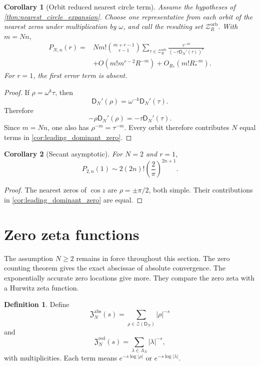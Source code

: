 \documentclass[11pt,letterpaper]{article}
\newtheorem{corollary}[corollary]{Corollary}
\theoremstyle{definition}
\newtheorem{definition}[definition]{Definition}
\theoremstyle{remark}
\newcommand{\Zcal}{\mathcal Z}
\newcommand{\Dfun}{\mathsf D}
\begin{document}
\begin{corollary}[Orbit reduced nearest circle term]\label{cor:orbit_reduced_asymptotic}
Assume the hypotheses of \cref{thm:nearest_circle_expansion}.  Choose one representative from each orbit of the nearest zeros under multiplication by $\omega$, and call the resulting set $\Zcal_R^{\mathrm{orb}}$.  With $m=Nn$,
\[
\begin{aligned}
P_{N,n}(r)
={}&N m!\binom{m+r-1}{r-1}
\sum_{\tau\in\Zcal_R^{\mathrm{orb}}}
\frac{\tau^{-m}}{(-\tau\Dfun_N'(\tau))^r}
\\
&+O\left(m!m^{r-2}R^{-m}\right)
+O_{R_*}\left(m!R_*^{-m}\right).
\end{aligned}
\]
For $r=1$, the first error term is absent.
\end{corollary}

\begin{proof}
If $\rho=\omega^k\tau$, then
\[
\Dfun_N'(\rho)=\omega^{-k}\Dfun_N'(\tau).
\]
Therefore
\[
-\rho\Dfun_N'(\rho)
=-\tau\Dfun_N'(\tau).
\]
Since $m=Nn$, one also has $\rho^{-m}=\tau^{-m}$.  Every orbit therefore contributes $N$ equal terms in \cref{cor:leading_dominant_zero}.
\end{proof}

\begin{corollary}[Secant asymptotic]\label{cor:secant_asymptotic}
For $N=2$ and $r=1$,
\[
P_{2,n}(1)
\sim
2(2n)!\left(\frac2\pi\right)^{2n+1}.
\]
\end{corollary}

\begin{proof}
The nearest zeros of $\cos z$ are $\rho=\pm\pi/2$, both simple.  Their contributions in \cref{cor:leading_dominant_zero} are equal.
\end{proof}

\section{Zero zeta functions}\label{sec:zero_zeta}

The assumption $N\geq2$ remains in force throughout this section.  The zero counting theorem gives the exact abscissae of absolute convergence.  The exponentially accurate zero locations give more.  They compare the zero zeta with a Hurwitz zeta function.

\begin{definition}\label{def:absolute_zero_zetas}
Define
\[
\mathfrak Z_N^{\mathrm{abs}}(s)
=
\sum_{\rho\in\Zcal(\Dfun_N)}|\rho|^{-s}
\]
and
\[
\mathfrak Z_N^{\mathrm{red}}(s)
=
\sum_{\lambda\in\Lambda_N}|\lambda|^{-s},
\]
with multiplicities.  Each term means $e^{-s\log|\rho|}$ or $e^{-s\log|\lambda|}$.
\end{definition}
\end{document}
